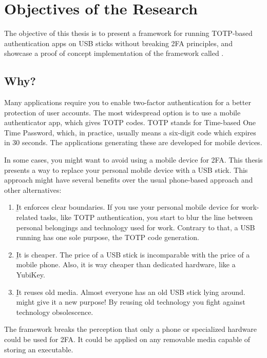 \chapter{Objectives of the Research}

The objective of this thesis is to present a framework for running TOTP-based authentication apps on USB sticks without breaking 2FA principles, and showcase a proof of concept implementation of the framework called \app{}.

\section{Why?}

Many applications require you to enable two-factor authentication for a better protection of user accounts.
The most widespread option is to use a mobile authenticator app, which gives TOTP codes.
TOTP stands for Time-based One Time Password, which, in practice, usually means a six-digit code which expires in 30 seconds.
The applications generating these are developed for mobile devices.

In some cases, you might want to avoid using a mobile device for 2FA.
This thesis presents a way to replace your personal mobile device with a USB stick.
This approach might have several benefits over the usual phone-based approach and other alternatives:
\begin{enumerate}
    \item \b{It enforces clear boundaries}.
        If you use your personal mobile device for work-related tasks, like TOTP authentication, you start to blur the line between personal belongings and technology used for work.
        Contrary to that, a USB running \app{} has one sole purpose, the TOTP code generation.
    \item \b{It is cheaper}.
        The price of a USB stick is incomparable with the price of a mobile phone.
        Also, it is way cheaper than dedicated hardware, like a YubiKey.
    \item \b{It reuses old media}.
        Almost everyone has an old USB stick lying around.
        \app{} might give it a new purpose!
        By reusing old technology you fight against technology obsolescence.        
\end{enumerate}

The framework breaks the perception that only a phone or specialized hardware could be used for 2FA.
It could be applied on any removable media capable of storing an executable.

